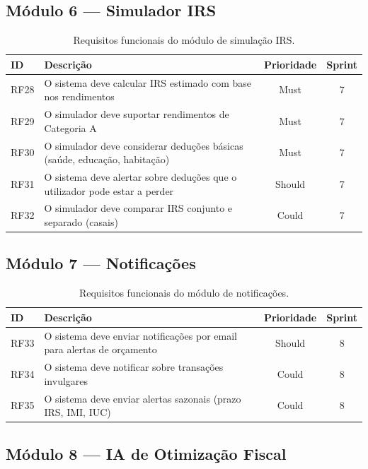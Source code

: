 \subsection{Módulo 6 --- Simulador IRS}

\begin{table}[H]
\centering
\caption{Requisitos funcionais do módulo de simulação IRS.}
\label{tab:rf-irs}
\small
\begin{tabularx}{\textwidth}{l X c c}
\toprule
\textbf{ID} & \textbf{Descrição} & \textbf{Prioridade} & \textbf{Sprint} \\
\midrule
RF28 & O sistema deve calcular \ac{IRS} estimado com base nos rendimentos & Must & 7 \\
RF29 & O simulador deve suportar rendimentos de Categoria A & Must & 7 \\
RF30 & O simulador deve considerar deduções básicas (saúde, educação, habitação) & Must & 7 \\
RF31 & O sistema deve alertar sobre deduções que o utilizador pode estar a perder & Should & 7 \\
RF32 & O simulador deve comparar \ac{IRS} conjunto e separado (casais) & Could & 7 \\
\bottomrule
\end{tabularx}
\end{table}

\subsection{Módulo 7 --- Notificações}

\begin{table}[H]
\centering
\caption{Requisitos funcionais do módulo de notificações.}
\label{tab:rf-notif}
\small
\begin{tabularx}{\textwidth}{l X c c}
\toprule
\textbf{ID} & \textbf{Descrição} & \textbf{Prioridade} & \textbf{Sprint} \\
\midrule
RF33 & O sistema deve enviar notificações por email para alertas de orçamento & Should & 8 \\
RF34 & O sistema deve notificar sobre transações invulgares & Could & 8 \\
RF35 & O sistema deve enviar alertas sazonais (prazo IRS, IMI, IUC) & Could & 8 \\
\bottomrule
\end{tabularx}
\end{table}

\subsection{Módulo 8 --- IA de Otimização Fiscal}

